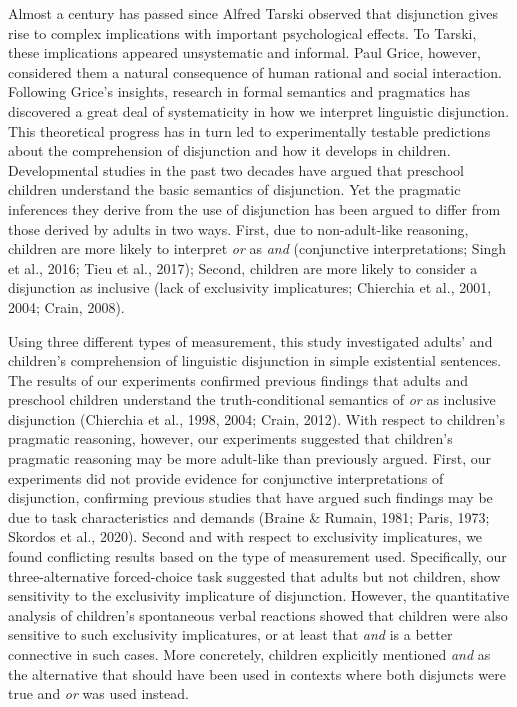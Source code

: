 \documentclass[
  english,
  ,man,floatsintext]{apa6}
\begin{document}
Almost a century has passed since Alfred Tarski observed that disjunction gives rise to complex implications with important psychological effects. To Tarski, these implications appeared unsystematic and informal. Paul Grice, however, considered them a natural consequence of human rational and social interaction. Following Grice's insights, research in formal semantics and pragmatics has discovered a great deal of systematicity in how we interpret linguistic disjunction. This theoretical progress has in turn led to experimentally testable predictions about the comprehension of disjunction and how it develops in children. Developmental studies in the past two decades have argued that preschool children understand the basic semantics of disjunction. Yet the pragmatic inferences they derive from the use of disjunction has been argued to differ from those derived by adults in two ways. First, due to non-adult-like reasoning, children are more likely to interpret \emph{or} as \emph{and} (conjunctive interpretations; Singh et al., 2016; Tieu et al., 2017); Second, children are more likely to consider a disjunction as inclusive (lack of exclusivity implicatures; Chierchia et al., 2001, 2004; Crain, 2008).

Using three different types of measurement, this study investigated adults' and children's comprehension of linguistic disjunction in simple existential sentences. The results of our experiments confirmed previous findings that adults and preschool children understand the truth-conditional semantics of \emph{or} as inclusive disjunction (Chierchia et al., 1998, 2004; Crain, 2012). With respect to children's pragmatic reasoning, however, our experiments suggested that children's pragmatic reasoning may be more adult-like than previously argued. First, our experiments did not provide evidence for conjunctive interpretations of disjunction, confirming previous studies that have argued such findings may be due to task characteristics and demands (Braine \& Rumain, 1981; Paris, 1973; Skordos et al., 2020). Second and with respect to exclusivity implicatures, we found conflicting results based on the type of measurement used. Specifically, our three-alternative forced-choice task suggested that adults but not children, show sensitivity to the exclusivity implicature of disjunction. However, the quantitative analysis of children's spontaneous verbal reactions showed that children were also sensitive to such exclusivity implicatures, or at least that \emph{and} is a better connective in such cases. More concretely, children explicitly mentioned \emph{and} as the alternative that should have been used in contexts where both disjuncts were true and \emph{or} was used instead.
\end{document}
